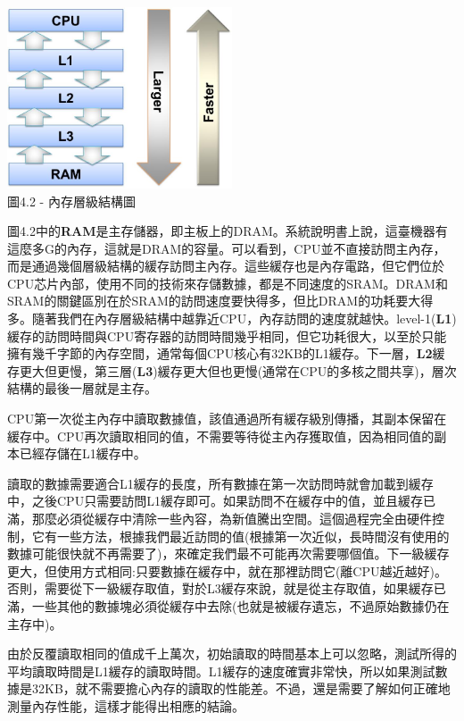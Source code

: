 \begin{center}
\includegraphics[width=0.5\textwidth]{content/1/chapter4/images/2.jpg}\\
圖4.2 - 內存層級結構圖
\end{center}

圖4.2中的\textbf{RAM}是主存儲器，即主板上的DRAM。系統說明書上說，這臺機器有這麼多G的內存，這就是DRAM的容量。可以看到，CPU並不直接訪問主內存，而是通過幾個層級結構的緩存訪問主內存。這些緩存也是內存電路，但它們位於CPU芯片內部，使用不同的技術來存儲數據，都是不同速度的SRAM。DRAM和SRAM的關鍵區別在於SRAM的訪問速度要快得多，但比DRAM的功耗要大得多。隨著我們在內存層級結構中越靠近CPU，內存訪問的速度就越快。level-1(\textbf{L1})緩存的訪問時間與CPU寄存器的訪問時間幾乎相同，但它功耗很大，以至於只能擁有幾千字節的內存空間，通常每個CPU核心有32KB的L1緩存。下一層，\textbf{L2}緩存更大但更慢，第三層(\textbf{L3})緩存更大但也更慢(通常在CPU的多核之間共享)，層次結構的最後一層就是主存。

CPU第一次從主內存中讀取數據值，該值通過所有緩存級別傳播，其副本保留在緩存中。CPU再次讀取相同的值，不需要等待從主內存獲取值，因為相同值的副本已經存儲在L1緩存中。

讀取的數據需要適合L1緩存的長度，所有數據在第一次訪問時就會加載到緩存中，之後CPU只需要訪問L1緩存即可。如果訪問不在緩存中的值，並且緩存已滿，那麼必須從緩存中清除一些內容，為新值騰出空間。這個過程完全由硬件控制，它有一些方法，根據我們最近訪問的值(根據第一次近似，長時間沒有使用的數據可能很快就不再需要了)，來確定我們最不可能再次需要哪個值。下一級緩存更大，但使用方式相同:只要數據在緩存中，就在那裡訪問它(離CPU越近越好)。否則，需要從下一級緩存取值，對於L3緩存來說，就是從主存取值，如果緩存已滿，一些其他的數據塊必須從緩存中去除(也就是被緩存遺忘，不過原始數據仍在主存中)。

由於反覆讀取相同的值成千上萬次，初始讀取的時間基本上可以忽略，測試所得的平均讀取時間是L1緩存的讀取時間。L1緩存的速度確實非常快，所以如果測試數據是32KB，就不需要擔心內存的讀取的性能差。不過，還是需要了解如何正確地測量內存性能，這樣才能得出相應的結論。

